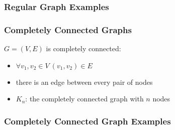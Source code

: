 \documentclass[dvipsnames]{beamer}
\begin{document}
\begin{frame}
  \frametitle{Regular Graph Examples}

  \begin{example}
    \begin{center}
    \end{center}
  \end{example}
\end{frame}

\begin{frame}
  \frametitle{Completely Connected Graphs}

  \begin{definition}
    $G=(V,E)$ is \alert{completely connected}:
    \begin{itemize}
      \item $\forall v_1,v_2 \in V~(v_1,v_2) \in E$
    \end{itemize}
  \end{definition}

  \pause
  \begin{itemize}
    \item there is an edge between every pair of nodes
    \item $K_n$: the completely connected graph with $n$ nodes
  \end{itemize}
\end{frame}

\begin{frame}
  \frametitle{Completely Connected Graph Examples}

  \begin{columns}
    \begin{example}[$K_4$]
      \begin{center}
      \end{center}
    \end{example}

    \begin{example}[$K_5$]
      \begin{center}
      \end{center}
    \end{example}
  \end{columns}
\end{frame}
\end{document}
